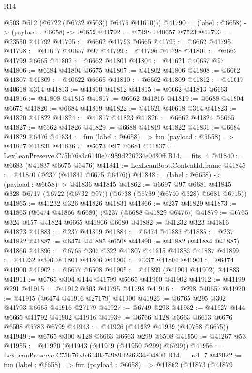 \begin{lexlean}{R14}
\begin{coremodule}
          @503
          @512
          (@6722 (@6732 @503))
          @6476
          @41610)))
@41790 := (label : @6658) -> (payload : @6658) -> @6659
@41792 := @7498 @40657 @7523
@41793 := @23550 @41792
@41795 := @6662 @41793 @6665
@41796 := @6662 @41795
@41798 := @41617 @40657 @97
@41799 := @41796 @41798
@41801 := @6662 @41799 @6665
@41802 := @6662 @41801
@41804 := @41621 @40657 @97
@41806 := @6684 @41804 @6675
@41807 := @41802 @41806
@41808 := @6662 @41807
@41809 := @40622 @6665
@41810 := @6662 @41809
@41812 := @41617 @40618 @314
@41813 := @41810 @41812
@41815 := @6662 @41813 @6663
@41816 := @41808 @41815
@41817 := @6662 @41816
@41819 := @6688 @41804 @6675
@41820 := @6684 @41819
@41822 := @41621 @40618 @314
@41823 := @41820 @41822
@41824 := @41817 @41823
@41826 := @6662 @41824 @6665
@41827 := @6662 @41826
@41829 := @6688 @41819 @41822
@41831 := @6684 @41829 @6476
@41834 := fun (label : @6658) => fun (payload : @6658) => @41827 @41831
@41836 := @6673 @97 @6681
@41837 := LexLeanPreserve.C75b76e3c6140e74989d226234e0480ff.R14.__fits_4
@41840 := @6683 (@41837 @6675 @6476)
@41841 := LexLeanBoot.ContentId.frame
@41845 := @41840 (@237 (@41841 @6675 @6476))
@41848 := (label : @6658) -> (payload : @6658) -> @41836 @41845
@41862 := @6697
    @97
    @6681
    @41845
    @328
    @6717
    (@6722 (@6732 @97))
    (@6738 (@6739 (@6740 @328) @6681 @6715))
@41865 := @41232 @326 @41826 @41831
@41866 := @237 @41829
@41873 := @41865 (@6474 @41866 @6680) (@237 (@6688 @41829 @6476))
@41879 := @6765 @324 @157 @41824 @6665 @41866 @6680
@41882 := @41232 @323 @41816 @41823
@41883 := @237 @41819
@41884 := @6474 @41883
@41885 := @237 @41822
@41887 := @6474 @41885 @6508
@41890 := @41882 (@41884 @41887) @41866
@41896 := @6765 @307 @322 @41807 @41815 @41883 @41887
@41899 := @41232 @306 @41801 @41806
@41900 := @237 @41804
@41901 := @6474 @41900
@41902 := @6677 @6508
@41905 := @41899 (@41901 @41902) @41883
@41911 := @6765 @304 @144 @41799 @6665 @41900 @41902
@41912 := @41199 @291
@41915 := @41912 @303 @41795 @41798
@41916 := @298 @40657
@41920 := @41915 (@6474 @41916 @27179) @41900
@41926 := @6765 @295 @302 @41793 @6665 @41916 @27179
@41927 := @6749 @293
@41932 := @41927 @144 @6665 @41792 @41902 @41916
@41939 := @6766 @128 @6663 @6663 @6676 @6508 @6783 @6799
@41943 := @41926 (@41932 @41939 (@40758 @6675))
@41949 := @6765 @300 @128 @6663 @6663 @299 @6508
@41950 := @41267 @53
@41955 := @41920 (@41943 (@41949 (@41950 @299) @6799))
@41956 := LexLeanPreserve.C75b76e3c6140e74989d226234e0480ff.R14.__rel_7
@42022 := fun (label : @6658) =>
  fun (payload : @6658) =>
  @41862
    (@41873
      (@41879

\end{coremodule}
\end{lexlean}
